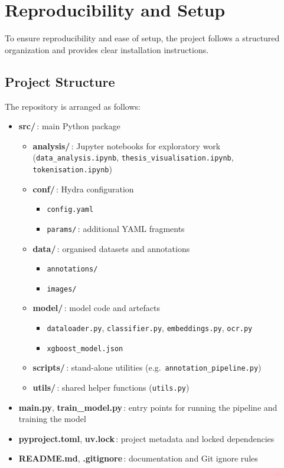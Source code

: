 \documentclass{SGGW-thesis-EN}
\begin{document}
\section{Reproducibility and Setup}

To ensure reproducibility and ease of setup, the project follows a structured organization and provides clear installation instructions.

\subsection{Project Structure}
The repository is arranged as follows:
\begin{itemize}
  \item \textbf{src/}\,: main Python package
    \begin{itemize}
      \item \textbf{analysis/}\,: Jupyter notebooks for exploratory work  
            (\texttt{data\_analysis.ipynb}, \texttt{thesis\_visualisation.ipynb}, \texttt{tokenisation.ipynb})
      \item \textbf{conf/}\,: Hydra configuration
        \begin{itemize}
          \item \texttt{config.yaml}
          \item \texttt{params/}\,: additional YAML fragments
        \end{itemize}
      \item \textbf{data/}\,: organised datasets and annotations
        \begin{itemize}
          \item \texttt{annotations/}
          \item \texttt{images/}
        \end{itemize}
      \item \textbf{model/}\,: model code and artefacts
        \begin{itemize}
          \item \texttt{dataloader.py}, \texttt{classifier.py}, \texttt{embeddings.py}, \texttt{ocr.py}
          \item \texttt{xgboost\_model.json}
        \end{itemize}
      \item \textbf{scripts/}\,: stand-alone utilities (e.g.\ \texttt{annotation\_pipeline.py})
      \item \textbf{utils/}\,: shared helper functions (\texttt{utils.py})
    \end{itemize}

  \item \textbf{main.py}, \textbf{train\_model.py}\,: entry points for running the pipeline and training the model
  \item \textbf{pyproject.toml}, \textbf{uv.lock}\,: project metadata and locked dependencies
  \item \textbf{README.md}, \textbf{.gitignore}\,: documentation and Git ignore rules
\end{itemize}
\end{document}
